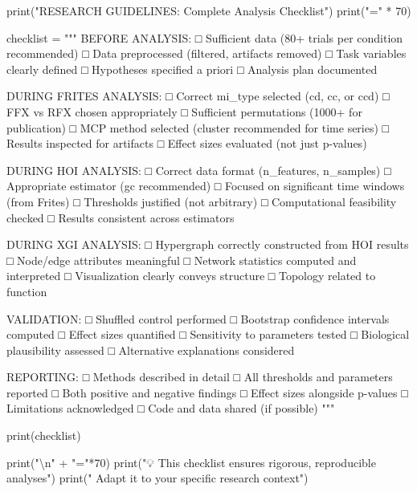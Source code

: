 \documentclass[
  11pt,
  letterpaper,
  oneside,
  openany]{book}
\newenvironment{Shaded}{\begin{snugshade}}{\end{snugshade}}
\newcommand{\BuiltInTok}[1]{\textcolor[rgb]{0.00,0.23,0.31}{#1}}
\newcommand{\CharTok}[1]{\textcolor[rgb]{0.13,0.47,0.30}{#1}}
\newcommand{\DecValTok}[1]{\textcolor[rgb]{0.68,0.00,0.00}{#1}}
\newcommand{\NormalTok}[1]{\textcolor[rgb]{0.00,0.23,0.31}{#1}}
\newcommand{\OperatorTok}[1]{\textcolor[rgb]{0.37,0.37,0.37}{#1}}
\newcommand{\StringTok}[1]{\textcolor[rgb]{0.13,0.47,0.30}{#1}}
\begin{document}
\begin{Shaded}
\begin{Highlighting}[]
\BuiltInTok{print}\NormalTok{(}\StringTok{"RESEARCH GUIDELINES: Complete Analysis Checklist"}\NormalTok{)}
\BuiltInTok{print}\NormalTok{(}\StringTok{"="} \OperatorTok{*} \DecValTok{70}\NormalTok{)}

\NormalTok{checklist }\OperatorTok{=} \StringTok{"""}
\StringTok{BEFORE ANALYSIS:}
\StringTok{□ Sufficient data (80+ trials per condition recommended)}
\StringTok{□ Data preprocessed (filtered, artifacts removed)}
\StringTok{□ Task variables clearly defined}
\StringTok{□ Hypotheses specified a priori}
\StringTok{□ Analysis plan documented}

\StringTok{DURING FRITES ANALYSIS:}
\StringTok{□ Correct mi\_type selected (cd, cc, or ccd)}
\StringTok{□ FFX vs RFX chosen appropriately}
\StringTok{□ Sufficient permutations (1000+ for publication)}
\StringTok{□ MCP method selected (cluster recommended for time series)}
\StringTok{□ Results inspected for artifacts}
\StringTok{□ Effect sizes evaluated (not just p{-}values)}

\StringTok{DURING HOI ANALYSIS:}
\StringTok{□ Correct data format (n\_features, n\_samples)}
\StringTok{□ Appropriate estimator (gc recommended)}
\StringTok{□ Focused on significant time windows (from Frites)}
\StringTok{□ Thresholds justified (not arbitrary)}
\StringTok{□ Computational feasibility checked}
\StringTok{□ Results consistent across estimators}

\StringTok{DURING XGI ANALYSIS:}
\StringTok{□ Hypergraph correctly constructed from HOI results}
\StringTok{□ Node/edge attributes meaningful}
\StringTok{□ Network statistics computed and interpreted}
\StringTok{□ Visualization clearly conveys structure}
\StringTok{□ Topology related to function}

\StringTok{VALIDATION:}
\StringTok{□ Shuffled control performed}
\StringTok{□ Bootstrap confidence intervals computed}
\StringTok{□ Effect sizes quantified}
\StringTok{□ Sensitivity to parameters tested}
\StringTok{□ Biological plausibility assessed}
\StringTok{□ Alternative explanations considered}

\StringTok{REPORTING:}
\StringTok{□ Methods described in detail}
\StringTok{□ All thresholds and parameters reported}
\StringTok{□ Both positive and negative findings}
\StringTok{□ Effect sizes alongside p{-}values}
\StringTok{□ Limitations acknowledged}
\StringTok{□ Code and data shared (if possible)}
\StringTok{"""}

\BuiltInTok{print}\NormalTok{(checklist)}

\BuiltInTok{print}\NormalTok{(}\StringTok{"}\CharTok{\textbackslash{}n}\StringTok{"} \OperatorTok{+} \StringTok{"="}\OperatorTok{*}\DecValTok{70}\NormalTok{)}
\BuiltInTok{print}\NormalTok{(}\StringTok{"💡 This checklist ensures rigorous, reproducible analyses"}\NormalTok{)}
\BuiltInTok{print}\NormalTok{(}\StringTok{"   Adapt it to your specific research context"}\NormalTok{)}
\end{Highlighting}
\end{Shaded}
\end{document}
